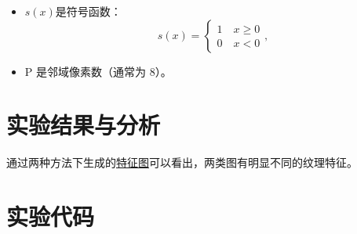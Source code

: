 \documentclass[a4paper,12pt]{report}
\begin{document}
\begin{itemize}
    \item $s(x)$是符号函数：
    $$s(x)=\left\{ \begin{array}{rcl}1\quad x\ge 0\\0\quad x<0\end{array}\right.,$$
    \item P 是邻域像素数（通常为 8）。
\end{itemize}
\section{实验结果与分析}
\par 通过两种方法下生成的\href{https://github.com/psa1K/Data_mining_2024/tree/main/datasets/exp1/output}{特征图}可以看出，两类图有明显不同的纹理特征。
\section{实验代码}
\end{document}
